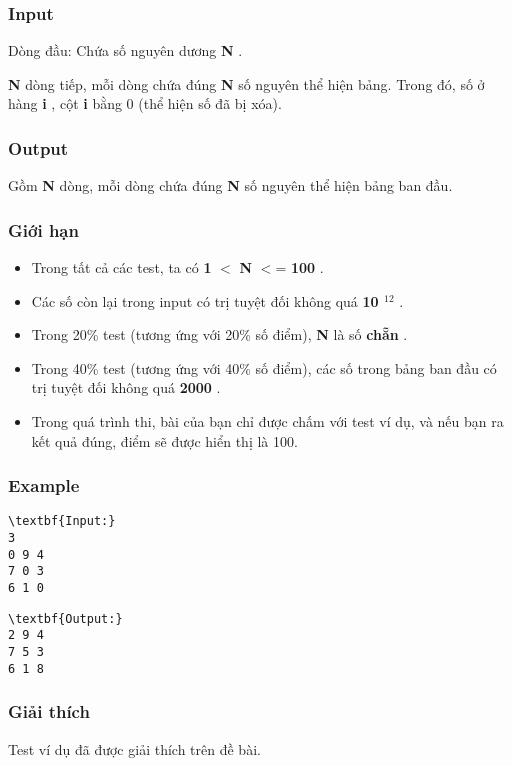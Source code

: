 \subsubsection{   Input  }

   Dòng đầu: Chứa số nguyên dương   \textbf{    N   }   .  

\textbf{    N   }   dòng tiếp, mỗi dòng chứa đúng   \textbf{    N   }   số nguyên thể hiện bảng. Trong đó, số ở hàng   \textbf{    i   }   , cột   \textbf{    i   }   bằng 0 (thể hiện số đã bị xóa).  

\subsubsection{   Output  }

   Gồm   \textbf{    N   }   dòng, mỗi dòng chứa đúng   \textbf{    N   }   số nguyên thể hiện bảng ban đầu.  

\subsubsection{   Giới hạn  }
\begin{itemize}
	\item     Trong tất cả các test, ta có    \textbf{     1    }    $<$    \textbf{     N    }    $<$=    \textbf{     100    }    .   
	\item     Các số còn lại trong input có trị tuyệt đối không quá    \textbf{     10     $^      12     $}    .   
	\item     Trong 20\% test (tương ứng với 20\% số điểm),    \textbf{     N    }    là số    \textbf{     chẵn    }    .   
	\item     Trong 40\% test (tương ứng với 40\% số điểm), các số trong bảng ban đầu có trị tuyệt đối không quá    \textbf{     2000    }    .   
	\item     Trong quá trình thi, bài của bạn chỉ được chấm với test ví dụ, và nếu bạn ra kết quả đúng, điểm sẽ được hiển thị là 100.   
\end{itemize}

\subsubsection{   Example  }
\begin{verbatim}
\textbf{Input:}
3
0 9 4
7 0 3
6 1 0
\end{verbatim}
\begin{verbatim}
\textbf{Output:}
2 9 4
7 5 3
6 1 8
\end{verbatim}

\subsubsection{   Giải thích  }

   Test ví dụ đã được giải thích trên đề bài.  